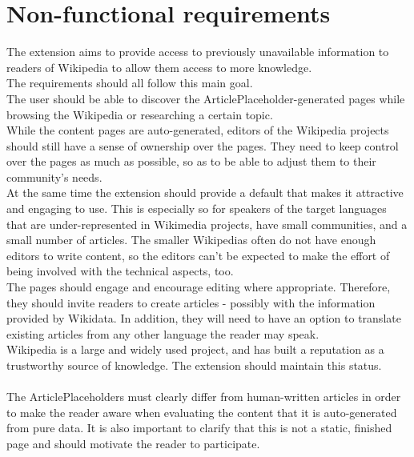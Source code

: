 \chapter{Non-functional requirements}

The extension aims to provide access to previously unavailable information to readers of Wikipedia to allow them access to more knowledge. \\
The requirements should all follow this main goal. \\
The user should be able to discover the ArticlePlaceholder-generated pages while browsing the Wikipedia or researching a certain topic. \\
While the content pages are auto-generated, editors of the Wikipedia projects should still have a sense of ownership over the pages. They need to keep control over the pages as much as possible, so as to be able to adjust them to their community's needs. \\
At the same time the extension should provide a default that makes it attractive and engaging to use. This is especially so for speakers of the target languages that are under-represented in Wikimedia projects, have small communities, and a small number of articles. The smaller Wikipedias often do not have enough editors to write content, so the editors can't be expected to make the effort of being involved with the technical aspects, too.  \\
The pages should engage and encourage editing where appropriate. Therefore, they should invite readers to create articles - possibly with the information provided by Wikidata. In addition, they will need to have an option to translate existing articles from any other language the reader may speak. \\
Wikipedia is a large and widely used project, and has built a reputation as a trustworthy source of knowledge. The extension should maintain this status. \\
\\
The ArticlePlaceholders must clearly differ from human-written articles in order to make the reader aware when evaluating the content that it is auto-generated from pure data. It is also important to clarify that this is not a static, finished page and should motivate the reader to participate. \\